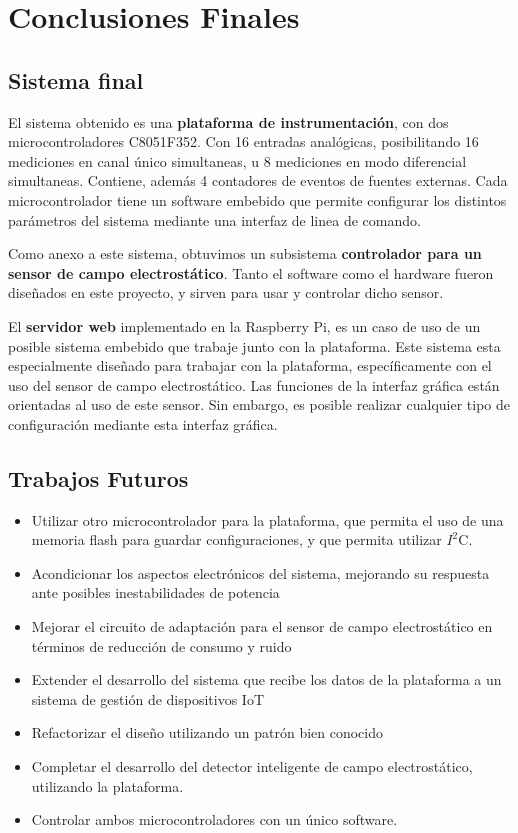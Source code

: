 \chapter{Conclusiones Finales} %
\label{cha:conclusiones}

\section{Sistema final} %
\label{sec:sistema_final}

El sistema obtenido es una \textbf{plataforma de instrumentación}, con dos microcontroladores C8051F352. Con 16 entradas analógicas, posibilitando 16 mediciones en canal único simultaneas, u 8 mediciones en modo diferencial simultaneas. Contiene, además 4 contadores de eventos de fuentes externas. Cada microcontrolador tiene un software embebido que permite configurar los distintos parámetros del sistema mediante una interfaz de linea de comando.

Como anexo a este sistema, obtuvimos un subsistema \textbf{controlador para un sensor de campo electrostático}. Tanto el software como el hardware fueron diseñados en este proyecto, y sirven para usar y controlar dicho sensor.

El \textbf{servidor web} implementado en la Raspberry Pi, es un caso de uso de un posible sistema embebido que trabaje junto con la plataforma. Este sistema esta especialmente diseñado para trabajar con la plataforma, específicamente con el uso del sensor de campo electrostático. Las funciones de la interfaz gráfica están orientadas al uso de este sensor. Sin embargo, es posible realizar cualquier tipo de configuración mediante esta interfaz gráfica.


\section{Trabajos Futuros} %
\label{sec:trabajos_futuros}

\begin{itemize}
	\item Utilizar otro microcontrolador para la plataforma, que permita el uso de una memoria flash para guardar configuraciones, y que permita utilizar $I^{2}$C.
	\item Acondicionar los aspectos electrónicos del sistema, mejorando su respuesta ante posibles inestabilidades de potencia
	\item Mejorar el circuito de adaptación para el sensor de campo electrostático en términos de reducción de consumo y ruido
	\item Extender el desarrollo del sistema que recibe los datos de la plataforma a un sistema de gestión de dispositivos IoT
	\item Refactorizar el diseño utilizando un patrón bien conocido
	\item Completar el desarrollo del detector inteligente de campo electrostático, utilizando la plataforma.
	\item Controlar ambos microcontroladores con un único software.
\end{itemize}



